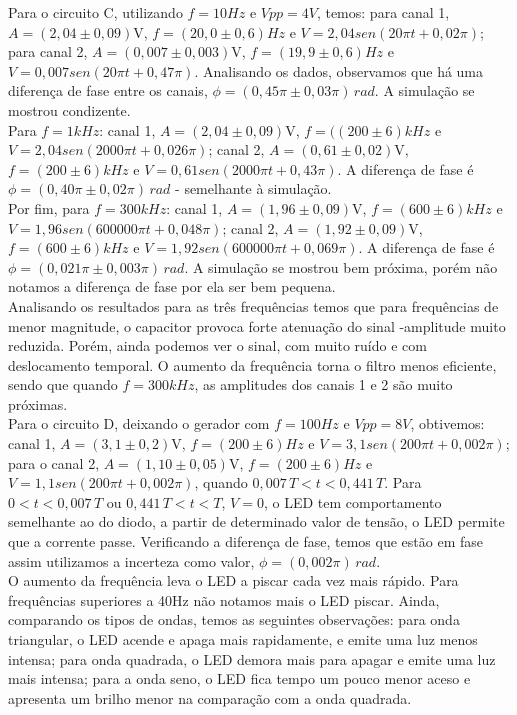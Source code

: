 \documentclass[a4paper, 11pt]{article}
\begin{document}
Para o circuito C, utilizando $f = 10Hz$ e $Vpp = 4V$, temos: para  canal 1, $A = (2,04 \pm 0,09)$V, $f = (20,0 \pm 0,6)Hz$ e $V = 2,04sen(20 \pi t + 0,02 \pi)$; para canal 2, $A = (0,007 \pm 0,003)$V, $f = (19,9 \pm 0,6)Hz$ e $V = 0,007sen(20\pi t + 0,47 \pi)$. 
Analisando os dados, observamos que há uma diferença de fase entre os canais, $\phi = (0,45 \pi \pm 0,03 \pi) \, rad $. A simulação se mostrou condizente.\\

Para $f = 1kHz$: canal 1, $A = (2,04 \pm 0,09)$V, $f = ((200 \pm 6)kHz$ e $V=2,04sen(2000 \pi t + 0,026 \pi )$; canal 2, $A = (0,61 \pm 0,02)$V, $f = (200 \pm 6)kHz$ e $V=0,61sen(2000 \pi t + 0,43 \pi )$. 
A diferença de fase é $\phi = (0,40 \pi  \pm 0,02 \pi ) \, rad$ - semelhante à simulação.\\

Por fim, para $f = 300kHz$: canal 1, $A = (1,96 \pm 0,09)$V, $f = (600 \pm 6)kHz$ e $V = 1,96sen(600000 \pi t + 0,048 \pi )$; canal 2, $A = (1,92 \pm 0,09)$V, $f = (600 \pm 6)kHz$ e $V= 1,92sen(600000 \pi t + 0,069 \pi )$. 
A diferença de fase é   $\phi  = (0,021 \pi \pm 0,003 \pi ) \, rad$. 
A simulação se mostrou bem próxima, porém não notamos a diferença de fase por ela ser bem pequena.\\

Analisando os resultados para as três frequências temos que para frequências de menor magnitude, o capacitor provoca forte atenuação do sinal -amplitude muito reduzida. 
Porém, ainda podemos ver o sinal, com muito ruído e com deslocamento temporal. 
O aumento da frequência torna o filtro menos eficiente, sendo que quando $f = 300kHz$, as amplitudes dos canais 1 e 2 são muito próximas. \\

Para o circuito D, deixando o gerador com $f = 100Hz$ e $Vpp = 8V$, obtivemos: canal 1, $A = (3,1   \pm  0,2)$V, $f = (200   \pm  6)Hz$ e $V = 3,1sen(200  \pi t + 0,002  \pi )$; para o canal 2, $A = (1,10   \pm  0,05)$V, $f = (200   \pm  6)Hz$ e $V = 1,1sen(200  \pi t + 0,002  \pi )$, quando $0,007 \, T < t < 0,441 \, T$. 
Para $ 0 < t < 0,007 \, T$ ou $0,441 \, T < t < T$, $V = 0$, o LED tem comportamento semelhante ao do diodo, a partir de determinado valor de tensão, o LED permite que a corrente passe. Verificando a diferença de fase, temos que estão em fase assim utilizamos a incerteza como valor, $\phi = (0,002\pi) \,rad$.\\

O aumento da frequência leva o LED a piscar cada vez mais rápido. 
Para frequências superiores a 40Hz não notamos mais o LED piscar. 
Ainda, comparando os tipos de ondas, temos as seguintes observações: para onda triangular, o LED acende e apaga mais rapidamente, e emite uma luz menos intensa; para onda quadrada, o LED demora mais para apagar e emite uma luz mais intensa; para a onda seno, o LED fica tempo um pouco menor aceso e apresenta um brilho menor na comparação com a onda quadrada. \\
\end{document}

